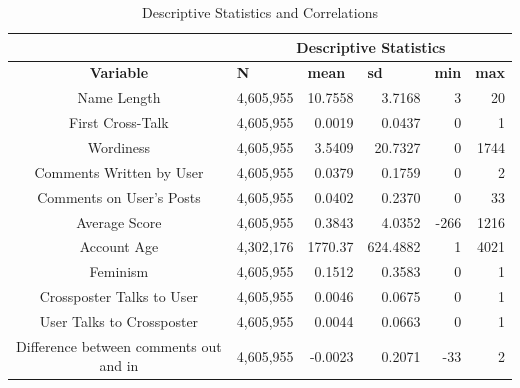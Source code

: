 \documentclass[letterpaper]{article}
\newcommand{\yy}[1]{{\textcolor{green}{yy: #1}}}
\begin{document}
\begin{table}
\caption{Descriptive Statistics and Correlations}
\centering
\begin{threeparttable}
\begin{adjustbox}{max width=\columnwidth}
\begin{tabular}{|c||r|r|r|r|r|}
\hline
& \multicolumn{5}{|c|}{\textbf{Descriptive Statistics}} \\\hline
\multicolumn{1}{|c||}{\textbf{Variable}}& \multicolumn{1}{l|}{\textbf{N}} & \multicolumn{1}{l|}{\textbf{mean}} & \multicolumn{1}{l|}{\textbf{sd}} & \multicolumn{1}{l|}{\textbf{min}} & \multicolumn{1}{l||}{\textbf{max}} \\\hline
Name Length & 4,605,955 & 10.7558 & 3.7168 & 3  & 20\\
First Cross-Talk & 4,605,955 & 0.0019 & 0.0437 & 0 & 1 \\
Wordiness& 4,605,955 & 3.5409 & 20.7327 & 0     & 1744 \\
Comments Written by User & 4,605,955 & 0.0379 & 0.1759 & 0 & 2 \\
Comments on User's Posts & 4,605,955 & 0.0402 & 0.2370 & 0 & 33 \\
Average Score & 4,605,955 & 0.3843 & 4.0352 & -266  & 1216 \\
Account Age & 4,302,176 & 1770.37 & 624.4882 & 1& 4021  \\
Feminism & 4,605,955 & 0.1512 & 0.3583 & 0  & 1 \\
Crossposter Talks to User & 4,605,955 & 0.0046 & 0.0675 & 0 & 1 \\
User Talks to Crossposter & 4,605,955 & 0.0044 & 0.0663 & 0  & 1\\
Difference between comments out and in & 4,605,955 & -0.0023 & 0.2071 & -33   & 2 \\\hline

\end{tabular}%
\end{adjustbox}
\end{threeparttable}
\label{tab:descrstat}
\end{table}
\end{document}
